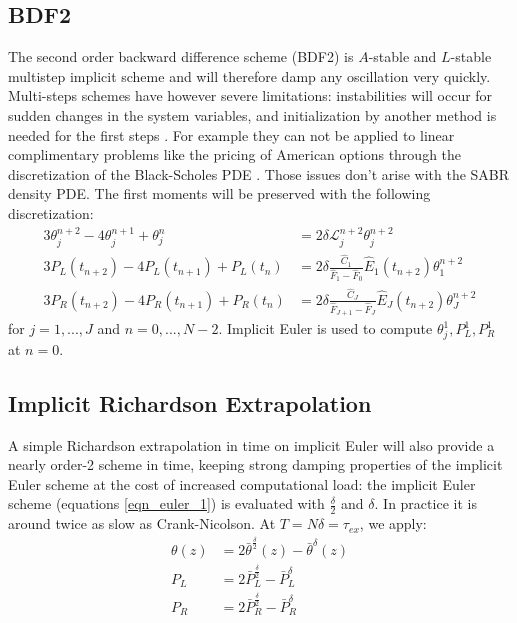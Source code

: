 \documentclass[]{rAMF2e}
\begin{document}
\subsection{BDF2}
The second order backward difference scheme (BDF2) is $A$-stable and $L$-stable multistep implicit scheme and will therefore damp any oscillation very quickly. Multi-steps schemes have however severe limitations: instabilities will occur for sudden changes in the system variables, and initialization by another method is needed for the first steps \citep{windcliff2001shout}. For example they can not be applied to linear complimentary problems like the pricing of American options through the discretization of the Black-Scholes PDE \citep{lefloc2013tr}. Those issues don't arise with the SABR density PDE. The first moments will be preserved with the following discretization:
\begin{subequations}
\begin{align}
3\theta_j^{n+2}-4\theta_j^{n+1}+\theta_j^n &= 2 \delta \mathcal{L}_{j}^{n+2} \theta_j^{n+2} \\
3 P_L (t_{n+2}) - 4 P_L (t_{n+1}) + P_L (t_{n}) &=2 \delta \frac{\hat{C}_1}{\hat{F}_1-\hat{F}_0}\hat{E}_1(t_{n+2})\theta_1^{n+2} \\
3 P_R (t_{n+2}) - 4 P_R (t_{n+1}) +  P_R (t_{n}) &= 2\delta \frac{\hat{C}_J}{\hat{F}_{J+1}-\hat{F}_J}\hat{E}_J(t_{n+2})\theta_J^{n+2}
\end{align}
\end{subequations}
for $j=1,...,J$ and $n=0,...,N-2$. Implicit Euler is used to compute $\theta_j^1, P_L^1, P_R^1$ at $n=0$.

\subsection{Implicit Richardson Extrapolation}
A simple Richardson extrapolation in time \citep{richardson1911approximate} on implicit Euler will also provide a nearly order-2 scheme in time, keeping strong damping properties of the implicit Euler scheme at the cost of increased computational load: the implicit Euler scheme (equations \ref{eqn_euler_1}) is evaluated with $\frac{\delta}{2}$ and $\delta$. In practice it is around twice as slow as Crank-Nicolson. At $T=N\delta=\tau_{ex}$, we apply:
\begin{align}\label{eqn_richardson}
\theta(z) &= 2 \bar{\theta}^{\frac{\delta}{2}}(z) - \bar{\theta}^{\delta}(z) \\
P_L &= 2 \bar{P}^{\frac{\delta}{2}}_L - \bar{P}^{\delta}_L\\
P_R &= 2 \bar{P}^{\frac{\delta}{2}}_R - \bar{P}^{\delta}_R
\end{align}
\end{document}
